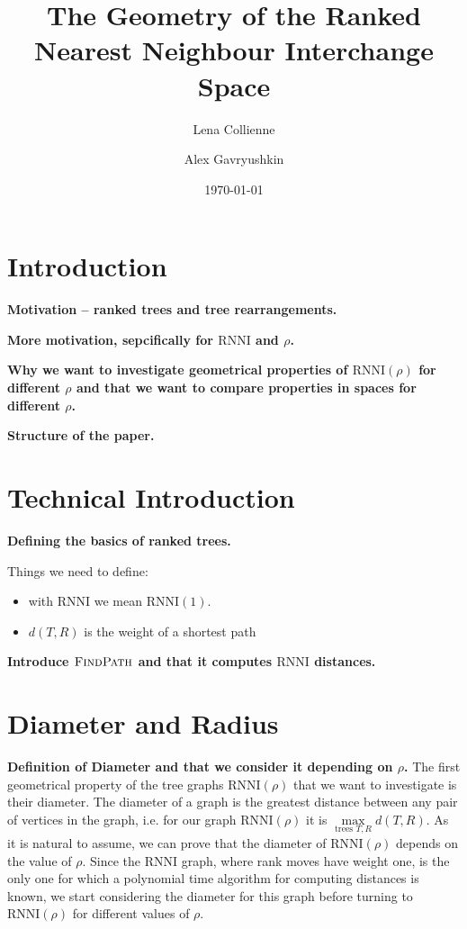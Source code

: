 \documentclass[11pt]{amsart}
\title[Geometry of ranked tree spaces]{The Geometry of the Ranked Nearest Neighbour Interchange Space}
\date{\today}
\author{Lena Collienne}
\author{Alex Gavryushkin\textsuperscript{\Letter}}
\newcommand{\rnni}{\mathrm{RNNI}}
\newcommand{\findpath}{\textsc{FindPath}}
\newcommand{\summary}[1]{\textbf{#1}} %
\begin{document}
\begin{abstract}
\end{abstract}

\maketitle


\section{Introduction}

\summary{Motivation -- ranked trees and tree rearrangements.}

\summary{More motivation, sepcifically for $\rnni$ and $\rho$.}

\summary{Why we want to investigate geometrical properties of $\rnni(\rho)$ for different $\rho$ and that we want to compare properties in spaces for different $\rho$.}

\summary{Structure of the paper.}


\section{Technical Introduction}

\summary{Defining the basics of ranked trees.}

Things we need to define:
\begin{itemize}
	\item with $\rnni$ we mean $\rnni(1)$.
	\item $d(T,R)$ is the weight of a shortest path
\end{itemize}

\summary{Introduce $\findpath$ and that it computes $\rnni$ distances.}


\section{Diameter and Radius}

\summary{Definition of Diameter and that we consider it depending on $\rho$.}
The first geometrical property of the tree graphs $\rnni(\rho)$ that we want to investigate is their diameter.
The diameter of a graph is the greatest distance between any pair of vertices in the graph, i.e. for our graph $\rnni(\rho)$ it is $\max\limits_{\text{trees }T,R}d(T,R)$.
As it is natural to assume, we can prove that the diameter of $\rnni(\rho)$ depends on the value of $\rho$.
Since the $\rnni$ graph, where rank moves have weight one, is the only one for which a polynomial time algorithm for computing distances is known, we start considering the diameter for this graph before turning to $\rnni(\rho)$ for different values of $\rho$.
\end{document}
